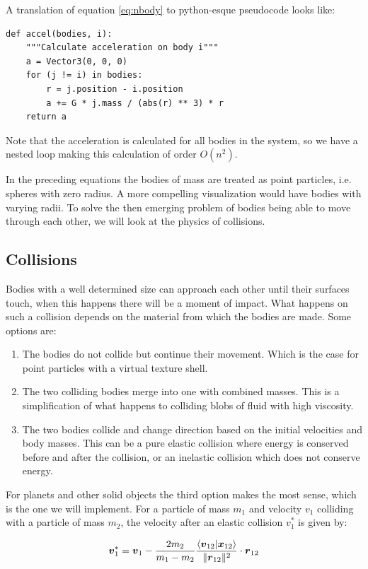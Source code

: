 \documentclass[a4paper]{article}
\newcommand{\vect}[1]{\boldsymbol{#1}}
\begin{document}
A translation of equation \ref{eq:nbody} to python-esque pseudocode looks like:
\begin{verbatim}
def accel(bodies, i):
    """Calculate acceleration on body i"""
    a = Vector3(0, 0, 0)
    for (j != i) in bodies:
        r = j.position - i.position
        a += G * j.mass / (abs(r) ** 3) * r
    return a
\end{verbatim}
Note that the acceleration is calculated for all bodies in the system, so we have a nested loop
making this calculation of order $O(n^{2})$.

In the preceding equations the bodies of mass are treated as point particles, i.e. spheres with zero
radius. A more compelling visualization would have bodies with varying radii. To solve the then
emerging problem of bodies being able to move through each other, we will look at the physics of
collisions.

\subsection{Collisions}
\label{sec:collisions}
Bodies with a well determined size can approach each other until their surfaces touch, when this
happens there will be a moment of impact. What happens on such a collision depends on the material
from which the bodies are made. Some options are:
\begin{enumerate}
\item The bodies do not collide but continue their movement. Which is the case for point particles
  with a virtual texture shell.
\item The two colliding bodies merge into one with combined masses. This is a simplification of what
  happens to colliding blobs of fluid with high viscosity.
\item The two bodies collide and change direction based on the initial velocities and body masses.
  This can be a pure elastic collision where energy is conserved before and after the collision, or
  an inelastic collision which does not conserve energy.
\end{enumerate}
For planets and other solid objects the third option makes the most sense, which is the one we will
implement. For a particle of mass $m_1$ and velocity $v_1$ colliding with a particle of mass $m_2$,
the velocity after an elastic collision $v_{1}^*$ is given by:

\begin{equation}
\label{eq:elColl}
 \vect{v}_{1}^*=\vect{v}_{1} - \frac{2 m_2}{m_1 - m_2}\frac{\braket{\vect{v}_{12}|\vect{x}_{12}}}{\| \vect{r}_{12}\|^2}\cdot \vect{r}_{12}
\end{equation}
\end{document}
